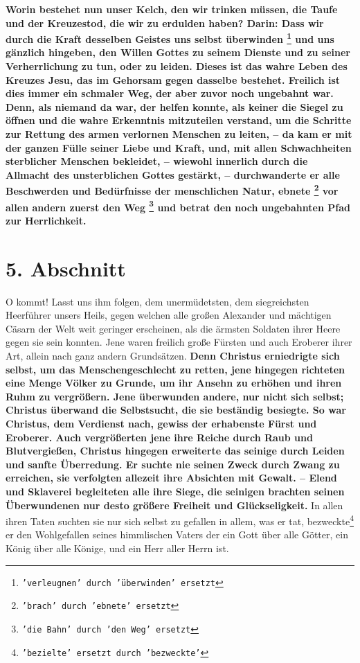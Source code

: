  
\textbf{Worin bestehet nun unser Kelch, den wir trinken müssen, die Taufe und
der
Kreuzestod, die wir zu erdulden haben? Darin: Dass wir durch die Kraft desselben
Geistes uns selbst überwinden \footnote{\texttt{'verleugnen' durch 'überwinden'
ersetzt}} und uns gänzlich hingeben, den Willen Gottes zu
seinem Dienste und zu seiner Verherrlichung zu tun, oder zu leiden. Dieses ist
das wahre Leben des Kreuzes Jesu, das im Gehorsam gegen dasselbe bestehet.
Freilich ist dies immer ein schmaler Weg, der aber zuvor noch ungebahnt war. Denn, als
niemand da war, der helfen konnte, als keiner die Siegel  zu
öffnen und die wahre
Erkenntnis mitzuteilen verstand, um die Schritte zur Rettung des armen
verlornen Menschen zu leiten, -- da kam er mit der ganzen Fülle seiner Liebe und
Kraft, und, mit allen Schwachheiten sterblicher Menschen bekleidet, -- wiewohl
innerlich durch die Allmacht  des unsterblichen Gottes
gestärkt, -- durchwanderte
er alle Beschwerden und Bedürfnisse der menschlichen Natur, ebnete
\footnote{\texttt{'brach' durch 'ebnete' ersetzt}} vor allen
andern zuerst den Weg \footnote{\texttt{'die Bahn' durch 'den Weg' ersetzt}} und
betrat den noch ungebahnten Pfad zur Herrlichkeit.}

\section{5. Abschnitt} \label{kap4_ab5}

O kommt! Lasst uns ihm folgen, dem unermüdetsten, dem siegreichsten Heerführer
unsers Heils, gegen welchen alle großen Alexander 
und mächtigen Cäsarn der Welt 
weit geringer erscheinen, als die ärmsten Soldaten ihrer Heere
 gegen sie sein
konnten. Jene waren freilich große Fürsten und auch Eroberer
 ihrer Art, allein
nach ganz andern Grundsätzen. \textbf{Denn Christus erniedrigte sich selbst, um
das
Menschengeschlecht zu retten, jene hingegen richteten eine Menge Völker zu
Grunde, um ihr Ansehn zu erhöhen und ihren Ruhm zu vergrößern. Jene überwunden
andere, nur nicht sich selbst; Christus überwand die Selbstsucht, die sie
beständig besiegte. So war Christus, dem Verdienst nach, gewiss der erhabenste
Fürst und Eroberer. Auch vergrößerten jene ihre Reiche durch Raub und
Blutvergießen, Christus hingegen erweiterte das seinige durch Leiden und sanfte
Überredung. Er suchte nie seinen Zweck durch Zwang zu erreichen, sie verfolgten
allezeit ihre Absichten mit Gewalt. -- Elend und Sklaverei begleiteten alle ihre
Siege, die seinigen brachten seinen Überwundenen nur desto größere Freiheit und
Glückseligkeit.} In allen ihren Taten suchten sie nur sich selbst zu gefallen
in allem, was er tat, bezweckte\footnote{\texttt{'bezielte' ersetzt durch 'bezweckte'}} 
er den Wohlgefallen seines himmlischen Vaters
der ein Gott über alle Götter, ein König über alle Könige, und ein Herr aller
Herrn ist.


